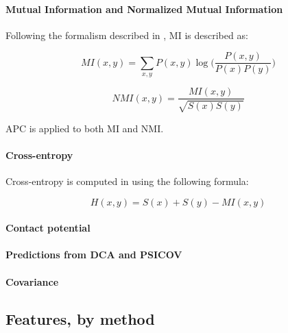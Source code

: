         \paragraph{Mutual Information and Normalized Mutual Information}

            Following the formalism described in \cite{Michel383133}, MI is described as:

            \begin{equation}
                MI(x, y) = \sum\limits_{x, y} P(x, y) \log \Big( \frac{P(x, y)}{P(x) P(y)} \Big)
            \end{equation}

            \begin{equation}
                NMI(x, y) = \frac{MI(x, y)}{\sqrt{S(x) S(y)}}
            \end{equation}

            APC is applied to both MI and NMI.

        \paragraph{Cross-entropy}

            Cross-entropy is computed in \cite{Michel383133} using the following formula:
            
            \begin{equation}
                H(x, y) = S(x) + S(y) - MI(x, y)
            \end{equation}

        \paragraph{Contact potential}

        \paragraph{Predictions from DCA and PSICOV}

        \paragraph{Covariance}

    \subsection{Features, by method}

